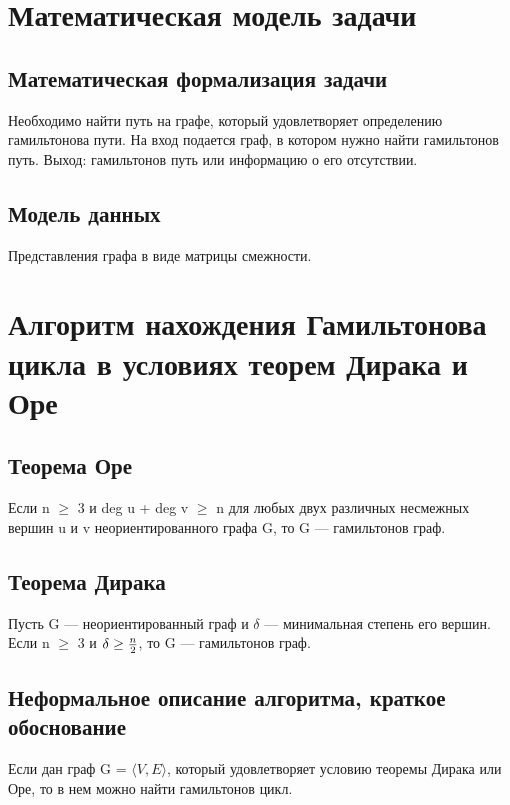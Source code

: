 \section{Математическая модель задачи}

\subsection{Математическая формализация задачи}
Необходимо найти путь на графе, который удовлетворяет определению гамильтонова пути.
На вход подается граф, в котором нужно найти гамильтонов путь.
Выход: гамильтонов путь или информацию о его отсутствии.

\subsection{Модель данных}
Представления графа в виде матрицы смежности.


\section{Алгоритм нахождения Гамильтонова цикла в условиях теорем Дирака и Оре}

\subsection{Теорема Оре}
Если n $\geq$ 3 и deg u + deg v $\geq$ n для любых двух различных несмежных вершин u и v неориентированного графа  G, то  G — гамильтонов граф.

\subsection{Теорема Дирака}
Пусть G — неориентированный граф и $\delta$ — минимальная степень его вершин.
Если n $\geq$ 3 и $\delta\geq{n\over{2}}$, то  G — гамильтонов граф.

\subsection{Неформальное описание алгоритма, краткое обоснование}
Если дан граф G = $\langle {V, E} \rangle$, который удовлетворяет условию теоремы Дирака или Оре,
то в нем можно найти гамильтонов цикл.

